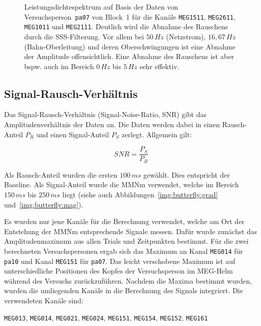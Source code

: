 \documentclass[doc,a4paper,12pt]{apa6}
\begin{document}
\begin{figure}
\begin{subfigure}[c]{0.47\textwidth}
    \label{img:freq-analy-sss}
  \end{subfigure}
  \captionsetup{justification=justified}
  \vspace*{3mm}
  \caption[Leistungsdichtespektrum auf Basis eines Blocks]{Leistungsdichtespektrum auf Basis der Daten von Versuchsperson~\texttt{pa07} von Block~1 für die Kanäle \texttt{MEG1511}, \texttt{MEG2611}, \texttt{MEG1011} und \texttt{MEG2111}. Deutlich wird die Abnahme des Rauschens durch die SSS-Filterung. Vor allem bei $50\,Hz$ (Netzstrom), $16,67\,Hz$ (Bahn-Oberleitung) und deren Oberschwingungen ist eine Abnahme der Amplitude offensichtlich. Eine Abnahme des Rauschens ist aber bspw. auch im Bereich $0\,Hz$ bis $5\,Hz$ sehr effektiv.}
  \label{img:freq-analy}
\end{figure}

\subsection{Signal-Rausch-Verhältnis}
\label{sec:snr}

Das Signal-Rausch-Verhältnis (Signal-Noise-Ratio, SNR) gibt das Amplitudenverhältnis der Daten an. Die Daten werden dabei in einen Rausch-Anteil $P_R$ und einen Signal-Anteil $P_S$ zerlegt. Allgemein gilt:

\begin{equation}
SNR = \frac{P_S}{P_R}
\end{equation}

Als Rausch-Anteil wurden die ersten $100\,ms$ gewählt. Dies entspricht der Baseline. Als Signal-Anteil wurde die MMNm verwendet, welche im Bereich $150\,ms$ bis $250\,ms$ liegt (siehe auch Abbildungen~\ref{img:butterfly:grad} und~\ref{img:butterfly:mag}).

Es wurden nur jene Kanäle für die Berechnung verwendet, welche am Ort der Entstehung der MMNm entsprechende Signale messen. Dafür wurde zunächst das Amplitudenmaximum aus allen Trials und Zeitpunkten bestimmt. Für die zwei berechneten Versuchspersonen ergab sich das Maximum an Kanal \texttt{MEG014} für \texttt{pa10} und Kanal \texttt{MEG151} für \texttt{pa07}. Das leicht verschobene Maximum ist auf unterschiedliche Positionen des Kopfes der Versuchsperson im MEG-Helm während des Versuchs zurückzuführen. Nachdem die Maxima bestimmt wurden, wurden die umliegenden Kanäle in die Berechnung des Signals integriert. Die verwendeten Kanäle sind:

\texttt{MEG013}, \texttt{MEG014}, \texttt{MEG021}, \texttt{MEG024}, \texttt{MEG151}, \texttt{MEG154}, \texttt{MEG152}, \texttt{MEG161}
\end{document}
